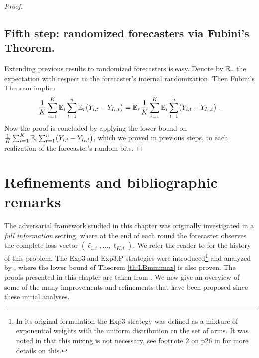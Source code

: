 \begin{proof}
\subsection*{Fifth step: randomized forecasters via Fubini's Theorem.}
%
Extending previous results to randomized forecasters is easy. Denote by $\mathbb{E}_r$ the expectation with respect to the forecaster's internal randomization. Then Fubini's Theorem implies
$$
\frac{1}{K} \sum_{i=1}^K \mathbb{E}_i\sum_{t=1}^n \mathbb{E}_r\bigl(Y_{i,t} - Y_{I_t,t}\bigr) = \mathbb{E}_r \frac{1}{K} \sum_{i=1}^K \mathbb{E}_i \sum_{t=1}^n \bigl(Y_{i,t} - Y_{I_t,t}\bigr)~.$$
Now the proof is concluded by applying the lower bound on $\tfrac{1}{K} \sum_{i=1}^K \mathbb{E}_i \sum_{t=1}^n \bigl(Y_{i,t} - Y_{I_t,t}\bigr)$, which we proved in previous steps, to each realization of the forecaster's random bits.
\end{proof}

\section{Refinements and bibliographic remarks}
The adversarial framework studied in this chapter was originally investigated in a {\em full information} setting, where at the end of each round the forecaster observes the complete loss vector $(\ell_{1,t}, \hdots, \ell_{K,t})$. We refer the reader to \cite{CL06} for the history of this problem. The Exp3 and Exp3.P strategies were introduced\footnote{In its original formulation the Exp3 strategy was defined as a mixture of exponential weights with the uniform distribution on the set of arms. It was noted in \cite{Sto05} that this mixing is not necessary, see footnote 2 on p26 in \cite{Bub10} for more details on this.} and analyzed by \cite{ACFS03}, where the lower bound of Theorem \ref{th:LBminimax} is also proven. The proofs presented in this chapter are taken from \cite{Bub10}. We now give an overview of some of the many improvements and refinements that have been proposed since these initial analyses.

